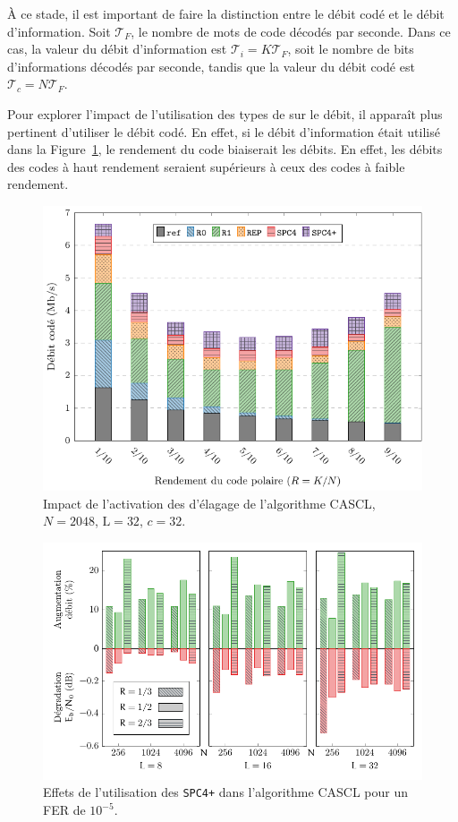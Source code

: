 \`A ce stade, il est important de faire la distinction entre le débit codé et le débit d'information. Soit $\mathcal{T}_F$, le nombre de mots de code décodés par seconde. Dans ce cas, la valeur du débit d'information est $\mathcal{T}_i=K\mathcal{T}_F$, soit le nombre de bits d'informations décodés par seconde, tandis que la valeur du débit codé est $\mathcal{T}_c=N\mathcal{T}_F$.

Pour explorer l'impact de l'utilisation des types de \noeuds sur le débit, il apparaît plus pertinent d'utiliser le débit codé. En effet, si le débit d'information était utilisé dans la Figure~\ref{fig:nodes}, le rendement du code \og biaiserait \fg les débits. En effet, les débits des codes à haut rendement seraient supérieurs à ceux des codes à faible rendement.
\begin{figure}[t]
\includegraphics[width=\textwidth]{main/ch2_fig/curves/tree/tikz/tree}
\caption{Impact de l'activation des \noeuds d'élagage de l'algorithme CASCL, $N=2048$, $\mathrm{L}=32$, $c=32$.}
\label{fig:nodes}
\end{figure}

\begin{figure}[t]
\includegraphics[width=\textwidth]{main/ch2_fig/curves/thr_spc/tikz/thr_spc_diff}
\caption{Effets de l'utilisation des \noeuds \texttt{SPC4+} dans l'algorithme CASCL pour un FER de $10^{-5}$.}
\label{fig:spc_impact}
\end{figure}

